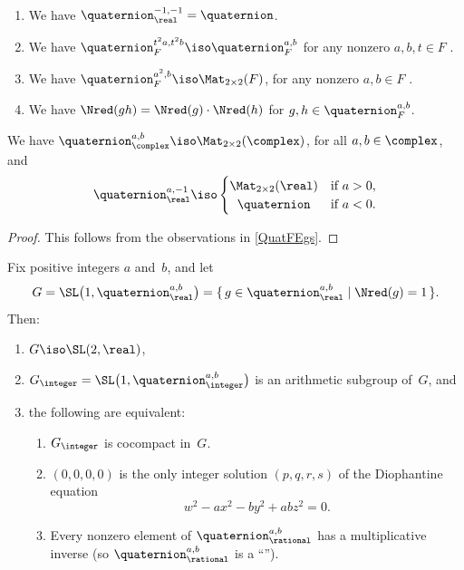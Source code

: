 \begin{eg} \label{QuatFEgs} \ 
 \begin{enumerate}
 \item We have $\quaternion^{-1,-1}_\real = \quaternion$.
 \item We have $\quaternion^{t^2 a, t^2 b}_F \iso
\quaternion^{a,b}_F$ for any nonzero $a,b,t \in F$
.
 \item \label{QuatFEgs-squaresplit}
 We have
$\quaternion^{a^2,b}_F \iso \Mat_{2 \times 2}(F)$, for any
nonzero $a,b \in F$ .
 \item We have $\Nred(gh) = \Nred(g) \cdot \Nred(h)$ for
$g,h \in \quaternion^{a,b}_F$.
 \end{enumerate}
 \end{eg}

\begin{lem} \label{QuatxF=}
  We have $\quaternion^{a,b}_\complex \iso
 \Mat_{2 \times 2}(\complex)$, for all $a,b \in
\complex$, and
 $$ \quaternion^{a,-1}_\real
 \iso \begin{cases}
 \Mat_{2 \times 2}(\real) & \text{if $a > 0$} , \\
 \hfil \quaternion & \text{if $a < 0$} .
 \end{cases}
 $$
 \end{lem}

\begin{proof}
 This follows from the observations in
\cref{QuatFEgs}.
 \end{proof}

\begin{prop} \label{ArithSL2RQuatQ}
 Fix positive integers $a$ and~$b$, and let
 $$G 
 = \SL \bigl( 1,\quaternion^{a,b}_\real \bigr) 
 = \{\, g \in \quaternion^{a,b}_\real \mid \Nred(g) = 1 \,\} .$$
 Then:
 \begin{enumerate}
 \item \label{ArithSL2RQuatQ-=SL2R}
 $G \iso \SL(2,\real)$,
 \item \label{ArithSL2RQuatQ-latt}
 $G_{\integer} = \SL \bigl( 1,\quaternion^{a,b}_\integer \bigr)$ is
an arithmetic subgroup of~$G$, and
 \item the following are equivalent:
 \begin{enumerate}
 \item \label{ArithSL2RQuatQ-cocpct}
 $G_{\integer}$ is cocompact in~$G$.
 \item \label{ArithSL2RQuatQ-nosoln}
 $(0,0,0,0)$ is the only integer solution $(p,q,r,s)$ of the
Diophantine equation 
	$$w^2 - a x^2 - b y^2 + ab z^2 = 0 .$$
 \item \label{ArithSL2RQuatQ-DivAlg}
 Every nonzero element of $\quaternion^{a,b}_\rational$ has a multiplicative inverse \textup(so $\quaternion^{a,b}_\rational$ is a ``''\/\textup).
 \end{enumerate}
 \end{enumerate}
 \end{prop}

